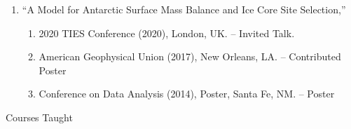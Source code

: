 \documentclass[12pt]{article}
\newcommand{\head}[1]{ %
    \bigskip %
    \begin{large}\begin{bf}{#1}\end{bf}\end{large} %

    \ \\ [-1.3cm] %

    \hrulefill}
\begin{document}
\begin{enumerate}[label=$\bullet$]
\item  ``A Model for Antarctic Surface Mass Balance and Ice Core Site Selection,'' 
\begin{enumerate}[label=$\cdot$]
\item 2020 TIES Conference (2020), London, UK. -- Invited Talk.
\item American Geophysical Union (2017), New Orleans, LA. -- Contributed Poster
\item Conference on Data Analysis (2014), Poster, Santa Fe, NM. --  Poster
\end{enumerate}
\end{enumerate}

\head{Courses Taught}
\end{document}
